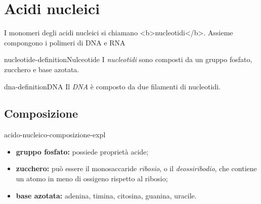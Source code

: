 \documentclass[preview]{standalone}
\begin{document}
\genpage

\section{Acidi nucleici}

\begin{plainhtml}
    I monomeri degli acidi nucleici si chiamano <b>nucleotidi</b>. Assieme compongono i polimeri di DNA e RNA
\end{plainhtml}

\begin{snippetdefinition}{nucleotide-definition}{Nulceotide}
    I \textit{nucleotidi} sono composti da un gruppo fosfato, zucchero e base azotata.
\end{snippetdefinition}

\begin{snippetdefinition}{dna-definition}{DNA}
    Il \textit{DNA} è composto da due filamenti di nucleotidi.
\end{snippetdefinition}

\subsection{Composizione}


\begin{snippet}{acido-nucleico-composizione-expl}
    \begin{itemize}
        \item \textbf{gruppo fosfato:} possiede proprietà acide;
        \item \textbf{zucchero:} può essere il monosaccaride \textit{ribosio}, o il \textit{deossiribodio},
            che contiene un atomo in meno di ossigeno rispetto al ribosio;
        \item \textbf{base azotata:} adenina, timina, citosina, guanina, uracile.
    \end{itemize}
\end{snippet}
\end{document}
